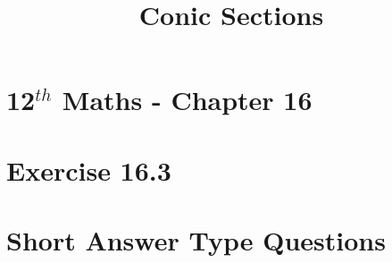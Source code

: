 \documentclass[12pt]{article}
\begin{document}
\begin{center}
\enlargethispage{-4cm}
\title{\textbf{Conic Sections}}
\date{\vspace{-5ex}} %
\maketitle
\end{center}
\setcounter{page}{1}
\section*{12$^{th}$ Maths - Chapter 16}
\section*{Exercise 16.3}
\section*{Short Answer Type Questions}
\end{document}
